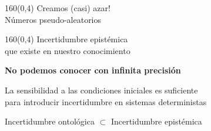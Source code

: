 \documentclass[shownotes,aspectratio=169]{beamer}
\begin{document}
\begin{frame}[plain]






\end{frame}


\begin{frame}[plain]
\begin{textblock}{160}(0,4)
\centering \LARGE Creamos (casi) azar! \\
\Large Números pseudo-aleatorios
\end{textblock}


\end{frame}


\begin{frame}[plain]
 \begin{textblock}{160}(0,4)
 \centering \LARGE Incertidumbre epistémica \\
 \Large que existe en nuestro conocimiento
 \end{textblock}
 \vspace{1.7cm} \centering

 \pause

\textbf{No podemos conocer con infinita precisión}

\vspace{0.6cm}

 La sensibilidad a las condiciones iniciales es suficiente \\ para introducir incertidumbre en sistemas deterministas

\pause \vspace{1.2cm}


Incertidumbre ontológica $\subset$ Incertidumbre epistémica
\end{frame}
\end{document}
